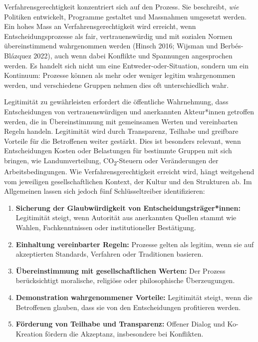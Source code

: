 \documentclass[
  nswissgerman,
  a4paper,
  openany]{book}
\begin{document}
Verfahrensgerechtigkeit konzentriert sich auf den Prozess. Sie
beschreibt, \emph{wie} Politiken entwickelt, Programme gestaltet und
Massnahmen umgesetzt werden. Ein hohes Mass an Verfahrensgerechtigkeit
wird erreicht, wenn Entscheidungsprozesse als fair, vertrauenswürdig und
mit sozialen Normen übereinstimmend wahrgenommen werden (Hinsch 2016;
Wijsman und Berbés-Blázquez 2022), auch wenn dabei Konflikte und
Spannungen angesprochen werden. Es handelt sich nicht um eine
Entweder-oder-Situation, sondern um ein Kontinuum: Prozesse können als
mehr oder weniger legitim wahrgenommen werden, und verschiedene Gruppen
nehmen dies oft unterschiedlich wahr.

Legitimität zu gewährleisten erfordert die öffentliche Wahrnehmung, dass
Entscheidungen von vertrauenswürdigen und anerkannten Akteur*innen
getroffen werden, die in Übereinstimmung mit gemeinsamen Werten und
vereinbarten Regeln handeln. Legitimität wird durch Transparenz,
Teilhabe und greifbare Vorteile für die Betroffenen weiter gestärkt.
Dies ist besonders relevant, wenn Entscheidungen Kosten oder Belastungen
für bestimmte Gruppen mit sich bringen, wie Landumverteilung,
CO\textsubscript{2}-Steuern oder Veränderungen der Arbeitsbedingungen.
Wie Verfahrensgerechtigkeit erreicht wird, hängt weitgehend vom
jeweiligen gesellschaftlichen Kontext, der Kultur und den Strukturen ab.
Im Allgemeinen lassen sich jedoch fünf Schlüsseltreiber identifizieren:

\begin{enumerate}
\def\labelenumi{\arabic{enumi}.}
\item
  \textbf{Sicherung der Glaubwürdigkeit von Entscheidungsträger*innen:}
  Legitimität steigt, wenn Autorität aus anerkannten Quellen stammt wie
  Wahlen, Fachkenntnissen oder institutioneller Bestätigung.
\item
  \textbf{Einhaltung vereinbarter Regeln:} Prozesse gelten als legitim,
  wenn sie auf akzeptierten Standards, Verfahren oder Traditionen
  basieren.
\item
  \textbf{Übereinstimmung mit gesellschaftlichen Werten:} Der Prozess
  berücksichtigt moralische, religiöse oder philosophische
  Überzeugungen.
\item
  \textbf{Demonstration wahrgenommener Vorteile:} Legitimität steigt,
  wenn die Betroffenen glauben, dass sie von den Entscheidungen
  profitieren werden.
\item
  \textbf{Förderung von Teilhabe und Transparenz:} Offener Dialog und
  Ko-Kreation fördern die Akzeptanz, insbesondere bei Konflikten.
\end{enumerate}
\end{document}
